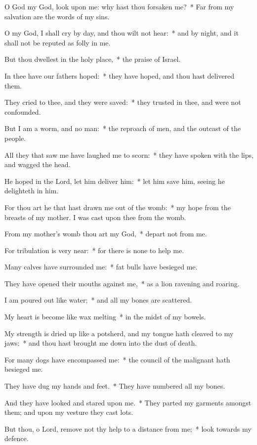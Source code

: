 \begin{enpars}
\item O God my God, look upon me: why hast thou forsaken me?~* Far from my salvation are the words of my sins.
\item O my God, I shall cry by day, and thou wilt not hear:~* and by night, and it shall not be reputed as folly in me.
\item But thou dwellest in the holy place,~* the praise of Israel.
\item In thee have our fathers hoped:~* they have hoped, and thou hast delivered them.
\item They cried to thee, and they were saved:~* they trusted in thee, and were not confounded.
\item But I am a worm, and no man:~* the reproach of men, and the outcast of the people.
\item All they that saw me have laughed me to scorn:~* they have spoken with the lips, and wagged the head.
\item He hoped in the Lord, let him deliver him:~* let him save him, seeing he delighteth in him.
\item For thou art he that hast drawn me out of the womb:~* my hope from the breasts of my mother. I was cast upon thee from the womb.
\item From my mother’s womb thou art my God,~* depart not from me.
\item For tribulation is very near:~* for there is none to help me.
\item Many calves have surrounded me:~* fat bulls have besieged me.
\item They have opened their mouths against me,~* as a lion ravening and roaring.
\item I am poured out like water;~* and all my bones are scattered.
\item My heart is become like wax melting~* in the midst of my bowels.
\item My strength is dried up like a potsherd, and my tongue hath cleaved to my jaws:~* and thou hast brought me down into the dust of death.
\item For many dogs have encompassed me:~* the council of the malignant hath besieged me.
\item They have dug my hands and feet.~* They have numbered all my bones.
\item And they have looked and stared upon me.~* They parted my garments amongst them; and upon my vesture they cast lots.
\item But thou, o Lord, remove not thy help to a distance from me;~* look towards my defence.

\end{enpars}
